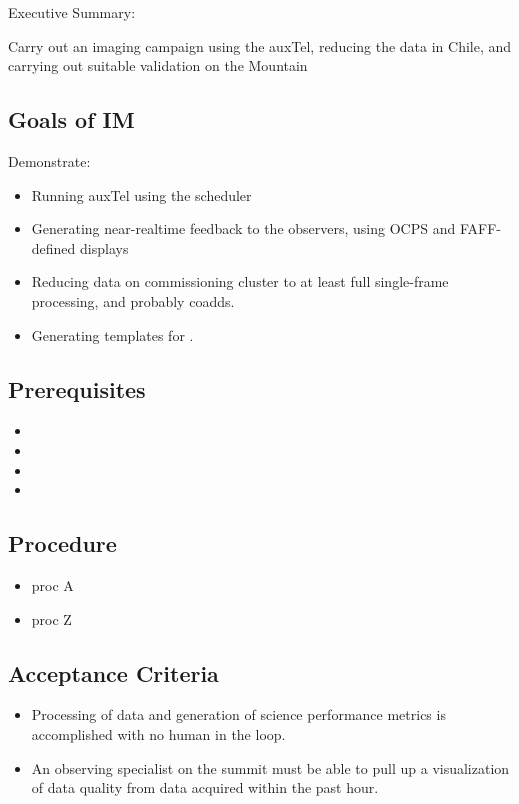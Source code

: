 
Executive Summary:

Carry out an imaging campaign using the auxTel, reducing the data in Chile, and
carrying out suitable validation on the Mountain

\subsection{Goals of IM}
Demonstrate:
\begin{itemize}
\item Running auxTel using the scheduler
\item Generating near-realtime feedback to the observers, using OCPS and FAFF-defined displays
\item Reducing data on commissioning cluster to at least full single-frame processing, and probably coadds.
\item Generating templates for .
\end{itemize}

\subsection{Prerequisites}
\begin{itemize}
\item {}
\item {}
\item {}
\item {}
\end{itemize}

\subsection{Procedure}
\begin{itemize}
\item proc A
\item proc Z
\end{itemize}

\subsection{Acceptance Criteria}
\begin{itemize}
\item Processing of data and generation of science performance metrics is accomplished with no human in the loop.
\item An observing specialist on the summit must be able to pull up a visualization of data quality from data acquired within the past hour.
\end{itemize}